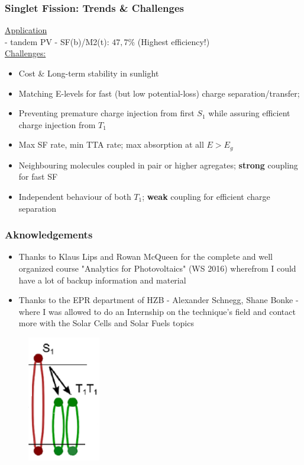 \documentclass[compress]{beamer}
\begin{document}
\begin{frame}
  \frametitle{Singlet Fission: Trends \& Challenges}
\vspace{-10pt}
\underline{Application}\\
- tandem PV - SF(b)/M2(t): $47,7\%$ (Highest efficiency!)\\

\underline{Challenges:}

\begin{itemize}
\item Cost \& Long-term stability in sunlight
\item Matching E-levels for fast (but low potential-loss) charge separation/transfer;
\item Preventing premature charge injection from first $S_1$ while assuring efficient charge injection from $T_1$
\item Max SF rate, min TTA rate; max absorption at all $E>E_g$
\item Neighbouring molecules coupled in pair or higher agregates; \textbf{strong} coupling for fast SF
\item Independent behaviour of both $T_1$; \textbf{weak} coupling for efficient charge separation
\end{itemize}

\end{frame}



\begin{frame}
  \frametitle{Aknowledgements}
\begin{itemize}
\item Thanks to Klaus Lips and Rowan McQueen for the complete and well organized course "Analytics for Photovoltaics" (WS 2016) wherefrom I could have a lot of backup information and material
\item Thanks to the EPR department of HZB - Alexander Schnegg, Shane Bonke - where I was allowed to do an Internship on the technique's field and contact more with the Solar Cells and Solar Fuels topics
\end{itemize}
\begin{figure}[H]
\includegraphics[width=0.15\columnwidth]{../img/SF_linda.pdf}
\end{figure}

\end{frame}
\end{document}
